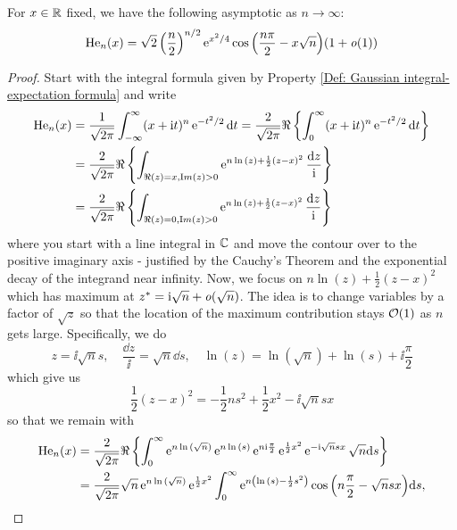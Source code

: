 \begin{prop}
	For $x \in \mathbb{R}$ fixed, we have the following asymptotic as $n \rightarrow \infty$:
	\begin{equation}
		\mathrm{He}_n(x) = \sqrt{2} \left(\frac{n}{2}\right)^{n/2} \operatorname{e}^{x^2/4} \cos{\left(\frac{n\pi}{2} - x \sqrt{n}\right)} (1 + \mathit{o}(1))
	\end{equation}
\end{prop}
\begin{proof}
	Start with the integral formula given by Property \ref{Def: Gaussian integral-expectation formula} and write
	\begin{align}
		\mathrm{He}_n(x) & = \frac{1}{\sqrt{2\pi}} \int_{-\infty}^{\infty} (x + \mathrm{i} t)^n \operatorname{e}^{-t^2/2} \mathrm{d} t = \frac{2}{\sqrt{2\pi}} \Re\left\{ \int_{0}^{\infty} (x + \mathrm{i} t)^n \operatorname{e}^{-t^2/2} \mathrm{d} t \right\} \\
		& = \frac{2}{\sqrt{2\pi}} \Re\left\{ \int_{\Re(z) = x, \mathop{\textrm Im}(z)>0} \operatorname{e}^{n\ln{(z)} + \frac{1}{2}(z-x)^2} \frac{\mathrm{d} z}{\mathrm{i}} \right\} \\
		& = \frac{2}{\sqrt{2\pi}} \Re\left\{ \int_{\Re(z) = 0, \mathop{\textrm Im}(z)>0} \operatorname{e}^{n\ln{(z)} + \frac{1}{2}(z-x)^2} \frac{\mathrm{d} z}{\mathrm{i}} \right\}
	\end{align}
	where you start with a line integral in $\mathbb{C}$ and move the contour over to the positive imaginary axis - justified by the Cauchy's Theorem and the exponential decay of the integrand near infinity. Now, we focus on $n\ln{(z)} + \frac{1}{2}(z-x)^2$ which has maximum at $z^* = \mathrm{i} \sqrt{n} + \mathit{o}(\sqrt{n})$. The idea is to change variables by a factor of $\sqrt{z}$ so that the location of the maximum contribution stays $\mathcal{O}(1)$ as $n$ gets large. Specifically, we do
	\begin{equation}
		z = \ii \sqrt{n} s, \quad \frac{\dd z}{\ii} = \sqrt{n} \dd s, \quad \ln{(z)} = \ln{(\sqrt{n})} + \ln{(s)} + \ii \frac{\pi}{2}
	\end{equation}  
	which give us
	\begin{equation}
		\frac{1}{2}(z-x)^2 = -\frac{1}{2} ns^2 + \frac{1}{2} x^2 - \ii \sqrt{n} sx	
	\end{equation}
	so that we remain with
	\begin{align}
		\He_n(x) & = \frac{2}{\sqrt{2\pi}} \Re\left\{ \int_{0}^{\infty} \ee^{n\ln{(\sqrt{n})}} \ee^{n\ln{(s)}} \ee^{n\ii\frac{\pi}{2}} \ee^{\frac{1}{2}x^2}\ee^{-\ii\sqrt{n}sx} \sqrt{n} \dd s \right\} \\
		& = \frac{2}{\sqrt{2\pi}} \sqrt{n} \ee^{n\ln{(\sqrt{n})}} \ee^{\frac{1}{2}x^2}  \int_{0}^{\infty} \ee^{n\left(\ln{(s)} - \frac{1}{2}s^2 \right)} \cos{\left(n\frac{\pi}{2} - \sqrt{n} s x\right)} \dd s,

\end{align}
\end{proof}
